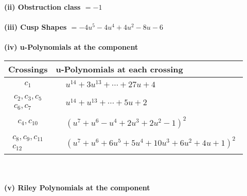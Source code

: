 \documentclass[1p]{elsarticle_modified}
\theoremstyle{definition}
\begin{document}
\flushleft \textbf{(ii) Obstruction class $= -1$}\\~\\
\flushleft \textbf{(iii) Cusp Shapes $= -4 u^5-4 u^4+4 u^2-8 u-6$}\\~\\
\newpage\renewcommand{\arraystretch}{1}
\flushleft \textbf{(iv) u-Polynomials at the component}\newline \\
\begin{tabular}{m{50pt}|m{274pt}}
Crossings & \hspace{64pt}u-Polynomials at each crossing \\
\hline $$\begin{aligned}c_{1}\end{aligned}$$&$\begin{aligned}
&u^{14}+3 u^{13}+\cdots+27 u+4
\end{aligned}$\\
\hline $$\begin{aligned}c_{2},c_{3},c_{5}\\c_{6},c_{7}\end{aligned}$$&$\begin{aligned}
&u^{14}+u^{13}+\cdots+5 u+2
\end{aligned}$\\
\hline $$\begin{aligned}c_{4},c_{10}\end{aligned}$$&$\begin{aligned}
&(u^7+u^6- u^4+2 u^3+2 u^2-1)^2
\end{aligned}$\\
\hline $$\begin{aligned}c_{8},c_{9},c_{11}\\c_{12}\end{aligned}$$&$\begin{aligned}
&(u^7+u^6+6 u^5+5 u^4+10 u^3+6 u^2+4 u+1)^2
\end{aligned}$\\
\hline
\end{tabular}\\~\\
\newpage\renewcommand{\arraystretch}{1}
\flushleft \textbf{(v) Riley Polynomials at the component}\newline \\
\end{document}
